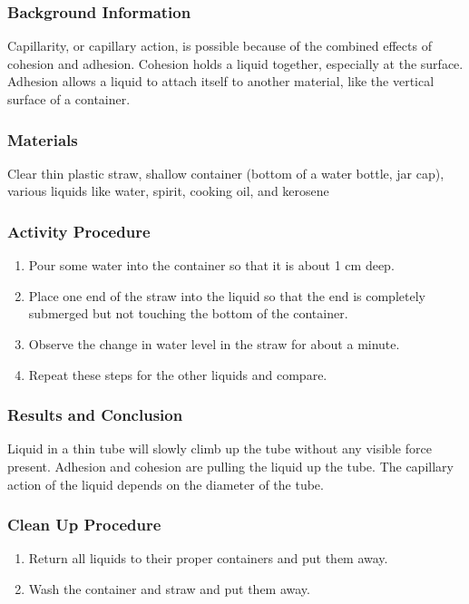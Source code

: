 \subsubsection*{Background Information}
Capillarity, or capillary action, is possible because of the combined effects of cohesion and adhesion. Cohesion holds a liquid together, especially at the surface. Adhesion allows a liquid to attach itself to another material, like the vertical surface of a container.  

\subsubsection*{Materials}
Clear thin plastic straw, shallow container (bottom of a water bottle, jar cap), various liquids like water, spirit, cooking oil, and kerosene  

\subsubsection*{Activity Procedure}
\begin{enumerate}
\item{Pour some water into the container so that it is about 1 cm deep.} 
\item{Place one end of the straw into the liquid so that the end is completely submerged but not touching the bottom of the container.} 
\item{Observe the change in water level in the straw for about a minute.} 
\item{Repeat these steps for the other liquids and compare.} 
\end{enumerate}

\subsubsection*{Results and Conclusion}
Liquid in a thin tube will slowly climb up the tube without any visible force present.  Adhesion and cohesion are pulling the liquid up the tube.  The capillary action of the liquid depends on the diameter of the tube.  

\subsubsection*{Clean Up Procedure}
\begin{enumerate}
\item{Return all liquids to their proper containers and put them away.} 
\item{Wash the container and straw and put them away.} 
\end{enumerate}

